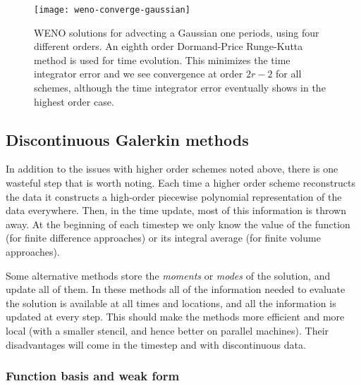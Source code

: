 \begin{figure}[t]
\centering
\texttt{[image: weno-converge-gaussian]}
\caption[Very high order WENO convergence rates for linear advection]
{\label{fig:weno-converge-gaussian} WENO solutions for advecting a Gaussian one periods, using four different orders. An eighth order Dormand-Price Runge-Kutta method is used for time evolution. This minimizes the time integrator error and we see convergence at order $2 r - 2$ for all schemes, although the time integrator error eventually shows in the highest order case. \\
}
\end{figure}
%

\subsection{Discontinuous Galerkin methods}
\label{sec:dg}

In addition to the issues with higher order schemes noted above, there is one
wasteful step that is worth noting. Each time a higher order scheme reconstructs
the data it constructs a high-order piecewise polynomial representation of the
data everywhere. Then, in the time update, most of this information is thrown
away. At the beginning of each timestep we only know the value of the function
(for finite difference approaches) or its integral average (for finite volume
approaches).

Some alternative methods store the \emph{moments} or \emph{modes} of the
solution, and update all of them. In these methods all of the information
needed to evaluate the solution is available at all times and locations, and
all the information is updated at every step. This should make the methods more
efficient and more local (with a smaller stencil, and hence better on parallel
machines). Their disadvantages will come in the timestep and with discontinuous
data.

\subsubsection{Function basis and weak form}
\label{sec:dg_basis}

